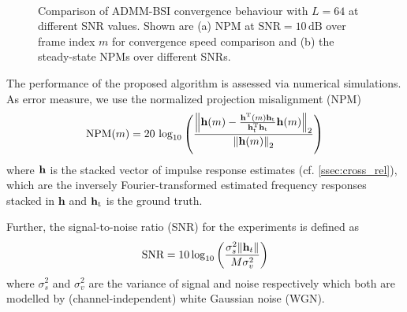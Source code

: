 \documentclass{article}
\newcommand{\h}{\mtxb{h}}
\newcommand{\hf}{{\bm{h}}}
\begin{document}
\begin{figure}[t]
    \centering
    \\
    \vspace*{-0.3cm}
    \vspace*{-0.2cm}
    \caption{Comparison of ADMM-BSI convergence behaviour with \(L\!=\!64\) at different SNR values. Shown are (a) NPM at \(\text{SNR}=10\,\text{dB}\) over frame index \(m\) for convergence speed comparison and (b) the steady-state NPMs over different SNRs.}
    \label{fig:perf_eval:NPM_over_time_exp1}
\end{figure}

The performance of the proposed algorithm is assessed via numerical simulations.
As error measure, we use the normalized projection misalignment (NPM) \cite{huangClassFrequencydomainAdaptive2003}
\begin{equation}
    \text{NPM}(m) = 20\,\log_{10} \left(\frac{\left\| \h(m) - \frac{\h^\T (m) \h_{\text{t}}}{\h_{\text{t}}^\T \h_{\text{t}}}\h(m) \right\|_2}{\left\|\h(m)\right\|_2} \right)
\end{equation}
where \(\h\) is the stacked vector of impulse response estimates (cf. \autoref{ssec:cross_rel}), which are the inversely Fourier-transformed estimated frequency responses stacked in \(\hf\) and \(\h_{\text{t}}\) is the ground truth.

Further, the signal-to-noise ratio (SNR) for the experiments is defined as 
\begin{equation}
    \text{SNR} = 10 \log_{10} \left(\frac{\sigma_s^2 \| \h_t \|}{M \sigma_v^2} \right)
\end{equation}
where \(\sigma_s^2\) and \(\sigma_v^2\) are the variance of signal and noise respectively which both are modelled by (channel-independent) white Gaussian noise (WGN).
\end{document}
